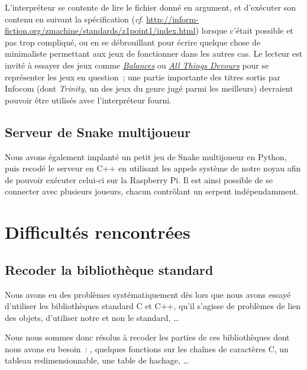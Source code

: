 \documentclass[11pt,a4paper]{article}
\begin{document}
L'interpréteur se contente de lire le fichier donné en argument, et
d'exécuter son contenu en suivant la spécification
(\textit{cf}.
\href{http://inform-fiction.org/zmachine/standards/z1point1/index.html}
{http://inform-fiction.org/zmachine/standards/z1point1/index.html})
lorsque c'était possible et pas trop compliqué, ou en se débrouillant
pour écrire quelque chose de minimaliste permettant aux jeux de
fonctionner dans les autres cas. Le lecteur est invité à essayer des
jeux comme
\href{http://ifdb.tads.org/viewgame?id=x6ne0bbd2oqm6h3a}{\textit{Balances}} ou
\href{http://ifdb.tads.org/viewgame?id=5e23lnq25gon9tp3}{\textit{All
    Things Devours}} pour se représenter les jeux en question~; une
partie importante des titres sortis par Infocom (dont \textit{Trinity}, un des
jeux du genre jugé parmi les meilleurs) devraient pouvoir être utilisés
avec l'interpréteur fourni.

\subsection{Serveur de Snake multijoueur}
Nous avons également implanté un petit jeu de Snake multijoueur en
Python, puis recodé le serveur en C++ en utilisant les appels système
de notre noyau afin de pouvoir exécuter celui-ci sur la Raspberry
Pi. Il est ainsi possible de se connecter avec plusieurs joueurs,
chacun contrôlant un serpent indépendamment.

\section{Difficultés rencontrées}


\subsection*{Recoder la bibliothèque standard}
Nous avons eu des problèmes systématiquement dès lors que nous avons essayé
d'utiliser les bibliothèques standard C et C++, qu'il s'agisse de problèmes de
lien des objets, d'utiliser notre  et non le 
standard, \ldots

Nous nous sommes donc résolus à recoder les parties de ces bibliothèques dont
nous avons eu besoin~: , quelques fonctions sur les chaînes de
caractères C, un tableau redimensionnable, une table de hachage, \ldots
\end{document}
